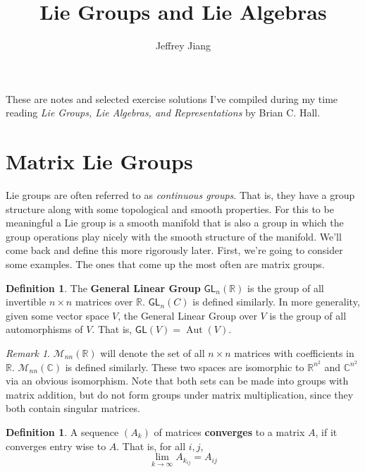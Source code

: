 \documentclass[psamsfonts]{amsart}
\theoremstyle{definition}
\newtheorem{defn}[thm]{Definition}
\theoremstyle{remark}
\newtheorem*{rem*}{Remark}
\newcommand{\R}{\mathbb{R}}
\newcommand{\C}{\mathbb{C}}
\newcommand{\GL}{\mathsf{GL}}
\DeclareMathOperator{\Aut}{Aut}
\begin{document}
\author{Jeffrey Jiang}
\title{Lie Groups and Lie Algebras}
\maketitle

These are notes and selected exercise solutions I've compiled during my time reading \emph{Lie Groups, Lie Algebras, and Representations} by Brian C. Hall.
\tableofcontents

\large
\setcounter{section}{0}


\section{Matrix Lie Groups}

Lie groups are often referred to as \emph{continuous groups}. That is, they have a group structure along with some topological and smooth properties. For this to be meaningful a Lie group is a smooth manifold that is also a group in which the group operations play nicely with the smooth structure of the manifold. We'll come back and define this more rigorously later. First, we're going to consider some examples. The ones that come up the most often are matrix groups.

\begin{defn}
The \textbf{General Linear Group} $\GL_n(\R)$ is the group of all invertible $n \times n$ matrices over $\R$. $\GL_n(C)$ is defined similarly. In more generality, given some vector space $V$, the General Linear Group over $V$ is the group of all automorphisms of $V$. That is, $\GL (V) = \Aut (V)$.
\end{defn}


\begin{rem*}
$\mathcal{M}_{nn}(\R)$ will denote the set of all $n \times n$ matrices with coefficients in $\R$. $\mathcal{M}_{nn}(\C)$ is defined similarly. These two spaces are isomorphic to $\R^{n^2}$ and $\C^{n^2}$ via an obvious isomorphism. Note that both sets can be made into groups with matrix addition, but do not form groups under matrix multiplication, since they both contain singular matrices.
\end{rem*}

\begin{defn}
A sequence $(A_k)$ of matrices \textbf{converges} to a matrix $A$, if it converges entry wise to $A$. That is, for all $i,j$,
$$\lim_{k \to \infty} A_{k_{ij}} = A_{ij} $$
\end{defn}
\end{document}

